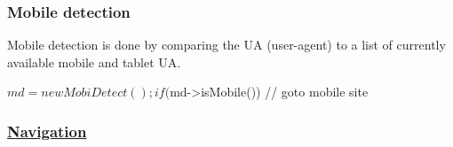 \subsubsection*{Mobile detection}

Mobile detection is done by comparing the U\-A (user-\/agent) to a list of currently available mobile and tablet U\-A. \begin{DoxyVerb}           $md = new MobiDetect();

           if ($md->isMobile()) {
                          // goto mobile site
           }
\end{DoxyVerb}


\subsubsection*{\hyperlink{class_navigation}{Navigation}}

